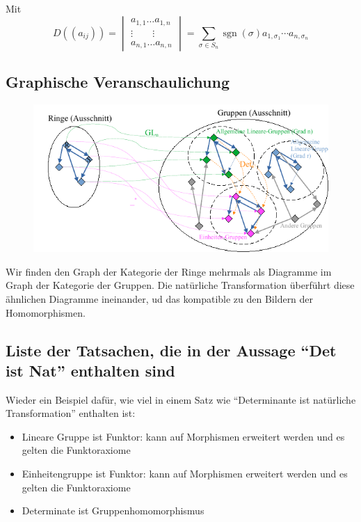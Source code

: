\documentclass[a4paper]{amsart}
\theoremstyle{definition}
\begin{document}
Mit 
\begin{equation}
   D( (a_{ij}) )={\begin{vmatrix}a_{1,1}\ldots a_{1,n}\\\vdots \qquad \vdots \\a_{n,1}\ldots a_{n,n}\end{vmatrix}}=\sum _{\sigma \in S_{n}}\operatorname {sgn}(\sigma )a_{1,\sigma _{1}}\cdots a_{n,\sigma _{n}}
\end{equation}

\subsection{Graphische Veranschaulichung}
\begin{figure}[h]
   \centering
   \includegraphics[width=\textwidth]{v5.0.1.0.4.4.5 Determinante als Natürliche Transformationen Bild.pdf}
\end{figure}

Wir finden den Graph der Kategorie der Ringe mehrmals als Diagramme im Graph der Kategorie der Gruppen. Die natürliche Transformation überführt diese ähnlichen Diagramme ineinander, ud das kompatible zu den Bildern der Homomorphismen.

\subsection{Liste der Tatsachen, die in der Aussage "`Det ist Nat"' enthalten sind}
Wieder ein Beispiel dafür, wie viel in einem Satz wie "`Determinante ist natürliche Transformation"' enthalten ist:
\begin{itemize}
   \item Lineare Gruppe ist Funktor: kann auf Morphismen erweitert werden und es gelten die Funktoraxiome
   \item Einheitengruppe ist Funktor: kann auf Morphismen erweitert werden und es gelten die Funktoraxiome
   \item Determinate ist Gruppenhomomorphismus
\end{itemize}
\end{document}
